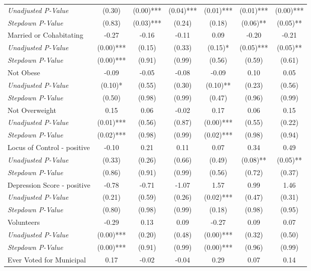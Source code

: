 \begin{tabular}{l c c c c c c}
\quad \textit{Unadjusted P-Value} & (0.30) & (0.00)*** & (0.04)*** & (0.01)*** & (0.01)*** & (0.00)*** \\
\quad \textit{Stepdown P-Value} & (0.83) & (0.03)*** & (0.24) & (0.18) & (0.06)** & (0.05)** \\
Married or Cohabitating & -0.27 & -0.16 & -0.11 & 0.09 & -0.20 & -0.21 \\
\quad \textit{Unadjusted P-Value} & (0.00)*** & (0.15) & (0.33) & (0.15)* & (0.05)*** & (0.05)** \\
\quad \textit{Stepdown P-Value} & (0.00)*** & (0.91) & (0.99) & (0.56) & (0.59) & (0.61) \\
Not Obese & -0.09 & -0.05 & -0.08 & -0.09 & 0.10 & 0.05 \\
\quad \textit{Unadjusted P-Value} & (0.10)* & (0.55) & (0.30) & (0.10)** & (0.23) & (0.56) \\
\quad \textit{Stepdown P-Value} & (0.50) & (0.98) & (0.99) & (0.47) & (0.96) & (0.99) \\
Not Overweight & 0.15 & 0.06 & -0.02 & 0.17 & 0.06 & 0.15 \\
\quad \textit{Unadjusted P-Value} & (0.01)*** & (0.56) & (0.87) & (0.00)*** & (0.55) & (0.22) \\
\quad \textit{Stepdown P-Value} & (0.02)*** & (0.98) & (0.99) & (0.02)*** & (0.98) & (0.94) \\
Locus of Control - positive & -0.10 & 0.21 & 0.11 & 0.07 & 0.34 & 0.49 \\
\quad \textit{Unadjusted P-Value} & (0.33) & (0.26) & (0.66) & (0.49) & (0.08)** & (0.05)** \\
\quad \textit{Stepdown P-Value} & (0.86) & (0.91) & (0.99) & (0.56) & (0.72) & (0.37) \\
Depression Score - positive & -0.78 & -0.71 & -1.07 & 1.57 & 0.99 & 1.46 \\
\quad \textit{Unadjusted P-Value} & (0.21) & (0.59) & (0.26) & (0.02)*** & (0.47) & (0.31) \\
\quad \textit{Stepdown P-Value} & (0.80) & (0.98) & (0.99) & (0.18) & (0.98) & (0.95) \\
Volunteers & -0.29 & 0.13 & 0.09 & -0.27 & 0.09 & 0.07 \\
\quad \textit{Unadjusted P-Value} & (0.00)*** & (0.20) & (0.48) & (0.00)*** & (0.32) & (0.50) \\
\quad \textit{Stepdown P-Value} & (0.00)*** & (0.91) & (0.99) & (0.00)*** & (0.96) & (0.99) \\
Ever Voted for Municipal & 0.17 & -0.02 & -0.04 & 0.29 & 0.07 & 0.14 \\

\end{tabular}
